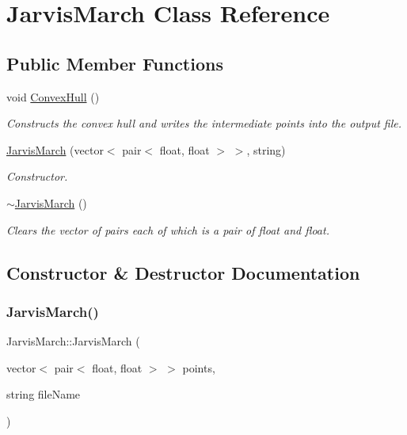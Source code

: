 \hypertarget{classJarvisMarch}{}\section{Jarvis\+March Class Reference}
\label{classJarvisMarch}
\subsection*{Public Member Functions}
\begin{DoxyCompactItemize}
\item 
\mbox{\label{classJarvisMarch_a48cf393997392ac717027270782fb166}} 
void \hyperlink{classJarvisMarch_a48cf393997392ac717027270782fb166}{Convex\+Hull} ()
\begin{DoxyCompactList}\small\item\em Constructs the convex hull and writes the intermediate points into the output file. \end{DoxyCompactList}\item 
\hyperlink{classJarvisMarch_a214a24699f76dc0f0f63cf128c08dadf}{Jarvis\+March} (vector$<$ pair$<$ float, float $>$ $>$, string)
\begin{DoxyCompactList}\small\item\em Constructor. \end{DoxyCompactList}\item 
\mbox{\label{classJarvisMarch_af7dcb92cfd508250c45f2134e064d086}} 
\hyperlink{classJarvisMarch_af7dcb92cfd508250c45f2134e064d086}{$\sim$\+Jarvis\+March} ()
\begin{DoxyCompactList}\small\item\em Clears the vector of pairs each of which is a pair of float and float. \end{DoxyCompactList}\end{DoxyCompactItemize}


\subsection{Constructor \& Destructor Documentation}
\mbox{\label{classJarvisMarch_a214a24699f76dc0f0f63cf128c08dadf}} 
\subsubsection{\texorpdfstring{Jarvis\+March()}{JarvisMarch()}}
{\footnotesize\ttfamily Jarvis\+March\+::\+Jarvis\+March (\begin{DoxyParamCaption}\item[{vector$<$ pair$<$ float, float $>$ $>$}]{points,  }\item[{string}]{file\+Name }\end{DoxyParamCaption})}



